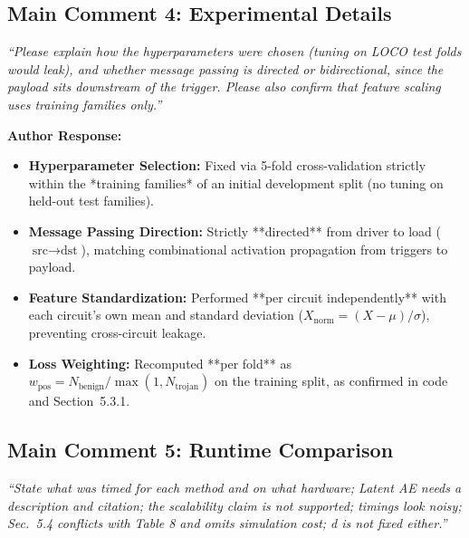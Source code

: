 \documentclass[11pt,a4paper]{article}
\newcommand{\reviewercomment}[1]{\vspace{4pt}\noindent\textcolor{revcomment}{\textit{``#1''}}\vspace{4pt}}
\newcommand{\authorresponse}{\noindent\textbf{Author Response:}}
\begin{document}
\subsection*{Main Comment 4: Experimental Details}

\reviewercomment{Please explain how the hyperparameters were chosen (tuning on LOCO test folds would leak), and whether message passing is directed or bidirectional, since the payload sits downstream of the trigger. Please also confirm that feature scaling uses training families only.}

\authorresponse
\begin{itemize}[leftmargin=*]
    \item \textbf{Hyperparameter Selection:} Fixed via 5-fold cross-validation strictly within the *training families* of an initial development split (no tuning on held-out test families).
    \item \textbf{Message Passing Direction:} Strictly **directed** from driver to load ($\text{src} \to \text{dst}$), matching combinational activation propagation from triggers to payload.
    \item \textbf{Feature Standardization:} Performed **per circuit independently** with each circuit's own mean and standard deviation ($X_{\text{norm}} = (X - \mu)/\sigma$), preventing cross-circuit leakage.
    \item \textbf{Loss Weighting:} Recomputed **per fold** as $w_{\text{pos}} = N_{\text{benign}} / \max(1, N_{\text{trojan}})$ on the training split, as confirmed in code and Section~5.3.1.
\end{itemize}

\subsection*{Main Comment 5: Runtime Comparison}

\reviewercomment{State what was timed for each method and on what hardware; Latent AE needs a description and citation; the scalability claim is not supported; timings look noisy; Sec.\ 5.4 conflicts with Table 8 and omits simulation cost; d is not fixed either.}
\end{document}
